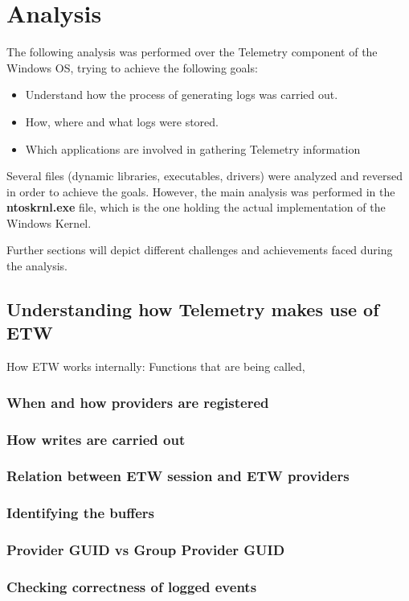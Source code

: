 \documentclass[11pt,a4paper,twoside]{tesis}
\begin{document}
\section*{Analysis}
The following analysis was performed over the Telemetry component of the Windows OS, trying to achieve the following goals:
\begin{itemize}
    \item Understand how the process of generating logs was carried out.
    \item How, where and what logs were stored.
    \item Which applications are involved in gathering Telemetry information
\end{itemize}

Several files (dynamic libraries, executables, drivers) were analyzed and reversed in order to achieve the goals. However, the main analysis was performed in the {\bfseries ntoskrnl.exe} file, which is the one holding the actual implementation of the Windows Kernel.

Further sections will depict different challenges and achievements faced during the analysis.

\subsection*{Understanding how Telemetry makes use of ETW}

How ETW works internally: Functions that are being called, 
\subsubsection*{When and how providers are registered}
\subsubsection*{How writes are carried out}
\subsubsection*{Relation between ETW session and ETW providers}
\subsubsection*{Identifying the buffers}
\subsubsection*{Provider GUID vs Group Provider GUID}
\subsubsection*{Checking correctness of logged events}
\end{document}
